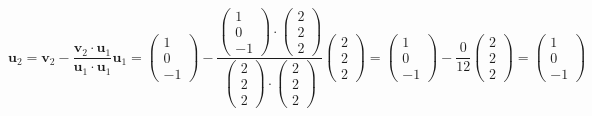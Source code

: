 \documentclass[a3paper,12pt]{extarticle} %
\begin{document}
\begin{enumerate}
\begin{enumerate}
\[            \mathbf{u}_2 = \mathbf{v}_2 - \frac{\mathbf{v}_2 \cdot \mathbf{u}_1}{\mathbf{u}_1 \cdot \mathbf{u}_1} \mathbf{u}_1 = \begin{pmatrix} 1 \\ 0 \\ -1 \end{pmatrix} - \frac{\begin{pmatrix} 1 \\ 0 \\ -1 \end{pmatrix} \cdot \begin{pmatrix} 2 \\ 2 \\ 2 \end{pmatrix}}{\begin{pmatrix} 2 \\ 2 \\ 2 \end{pmatrix} \cdot \begin{pmatrix} 2 \\ 2 \\ 2 \end{pmatrix}} \begin{pmatrix} 2 \\ 2 \\ 2 \end{pmatrix} = \begin{pmatrix} 1 \\ 0 \\ -1 \end{pmatrix} - \frac{0}{12} \begin{pmatrix} 2 \\ 2 \\ 2 \end{pmatrix} = \begin{pmatrix} 1 \\ 0 \\ -1 \end{pmatrix}
        \]
        \[
\]
\end{enumerate}
\end{enumerate}
\end{document}

